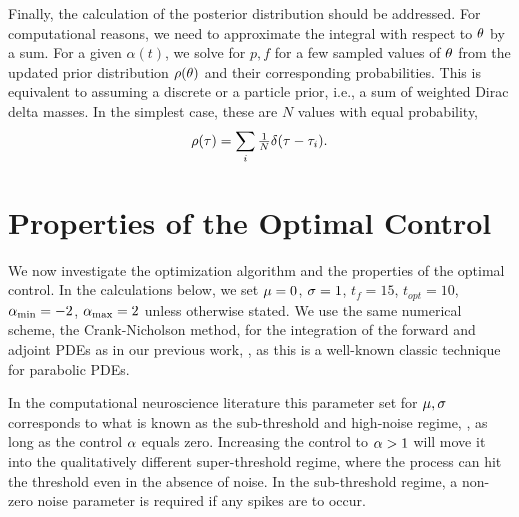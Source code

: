 \documentclass[12pt]{article}
\def \tf {{t_f}}
\def \topt {{ t_{opt}}}
\begin{document}
Finally, the calculation of the posterior distribution should be addressed. For
computational reasons, we need to approximate the integral with respect to ${\theta}$
by a sum. For a given $\alpha(t)$, we solve for $p,f$ for a few sampled values
of ${\theta}$ from the updated prior distribution $\rho({\theta})$ and their corresponding
probabilities. This is equivalent to assuming a discrete or a particle prior,
i.e., a sum of weighted Dirac delta masses. In the simplest case, these are $N$
values with equal probability,
\begin{equation}
\rho({ \tau }) = \sum_i  
	\tfrac 1N \delta({ \tau }- { \tau }_i) .
\label{eq:basic_prior_over_tau}
\end{equation} 
 
\section{Properties of the Optimal Control}
\label{sec:sim_study}
 
We now investigate the optimization algorithm and the properties of the optimal
control. In the calculations below, we set  ${\mu }=0$, ${\sigma } = 1$, $\tf=15$, $\topt =
10$, ${ {\alpha}_{\textrm{min}} }=-2$, ${ {\alpha}_{\textrm{max}} }=2$ unless otherwise stated. 
We use the same numerical scheme, the Crank-Nicholson method, for the
integration of the forward and adjoint PDEs as in our previous work,
\cite{Iolov2014a}, as this is a well-known classic technique for parabolic PDEs.

 
In the computational neuroscience literature this parameter set for ${\mu },{\sigma }$
corresponds to what is known as the sub-threshold and high-noise regime,
\cite{Iolov2013}, as long as the control ${\alpha}$ equals zero. Increasing the
control to ${\alpha}>1$ will move it into the qualitatively different super-threshold
regime, where the process can hit the threshold even in the absence of noise. In
the sub-threshold regime, a non-zero noise parameter is required if any spikes
are to occur.

\
\end{document}
